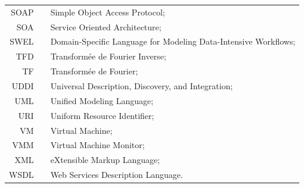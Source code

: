 \begin{center}
\begin{tabular}[t]{rp{5mm}p{12cm}}
        SOAP & & Simple Object Access Protocol;\\
        SOA & & Service Oriented Architecture;\\
        SWEL & & Domain-Specific Language for Modeling Data-Intensive Workflows;\\
        TFD & & Transformée de Fourier Inverse;\\
        TF & & Transformée de Fourier;\\
        UDDI & & Universal Description, Discovery, and Integration;\\
        UML & & Unified Modeling Language;\\
        URI & & Uniform Resource Identifier;\\
        VM & & Virtual Machine;\\
        VMM & & Virtual Machine Monitor;\\
        XML & & eXtensible Markup Language;\\
        WSDL & & Web Services Description Language.\\
        
	\end{tabular}
\end{center}
